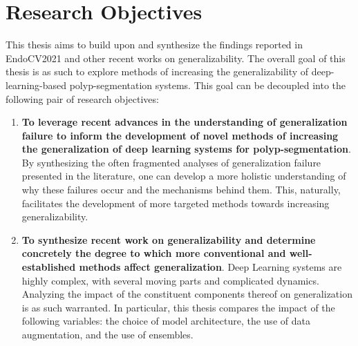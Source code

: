    \section{Research Objectives}
    This thesis aims to build upon and synthesize the findings reported in EndoCV2021 and other recent works on generalizability. The overall goal of this thesis is as such to explore methods of increasing the generalizability of deep-learning-based polyp-segmentation systems. This goal can be decoupled into the following pair of research objectives:
    \begin{enumerate}
        \item \textbf{To leverage recent advances in the understanding of generalization failure to inform the development of novel methods of increasing the generalization of deep learning systems for polyp-segmentation}. By synthesizing the often fragmented analyses of generalization failure presented in the literature, one can develop a more holistic understanding of why these failures occur and the mechanisms behind them. This, naturally, facilitates the development of more targeted methods towards increasing generalizability. \label{cont_1}

        \item \textbf{To synthesize recent work on generalizability and determine concretely the degree to which more conventional and well-established methods affect generalization}. Deep Learning systems are highly complex, with several moving parts and complicated dynamics. Analyzing the impact of the constituent components thereof on generalization is as such warranted. In particular, this thesis compares the impact of the following variables: the choice of model architecture, the use of data augmentation, and the use of ensembles. \label{cont_2}
    \end{enumerate}
   
